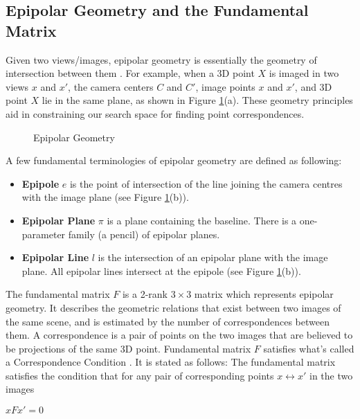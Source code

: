 \documentclass[11pt, a4paper, openany]{article}
\begin{document}
\subsection{Epipolar Geometry and the Fundamental Matrix} Given two views/images, epipolar geometry is essentially the geometry of intersection between them \cite{section 9.1}. For example, when a 3D point $X$ is imaged in two views $x$ and $x'$, the camera centers $C$ and $C'$, image points $x$ and $x'$, and 3D point $X$ lie in the same plane, as shown in Figure \ref{fig:epipolar}(a). These geometry principles aid in constraining our search space for finding point correspondences.\newline

\begin{figure}%
    \centering
    \qquad
    \caption{Epipolar Geometry}%
    \label{fig:epipolar}%
\end{figure}

A few fundamental terminologies of epipolar geometry are defined as following:
\begin{itemize}
\item \textbf{Epipole} $e$ is the point of intersection of the line joining the camera centres with the image plane (see Figure \ref{fig:epipolar}(b)).
\item \textbf{Epipolar Plane} $\pi$ is a plane containing the baseline. There is a one-parameter
family (a pencil) of epipolar planes.
\item \textbf{Epipolar Line} $l$ is the intersection of an epipolar plane with the image plane. All epipolar lines intersect at the epipole (see Figure \ref{fig:epipolar}(b)).
\end{itemize}
The fundamental matrix $F$ is a 2-rank $3\times3$ matrix which represents epipolar geometry. It describes the geometric relations that exist between two images of the same scene, and is estimated by the number of correspondences between them. A correspondence is a pair of points on the two images that are believed to be projections of the same 3D point. Fundamental matrix $F$ satisfies what's called a Correspondence Condition \cite{fundamentalcorrespondingcondition}. It is stated as follows: \newline
The fundamental matrix satisfies the condition that for any pair of corresponding points $x \leftrightarrow x'$ in the two images
\begin{center}$xFx' = 0$\end{center}
\end{document}
